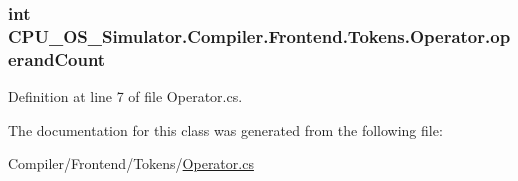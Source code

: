 \subsubsection[{operand\+Count}]{\setlength{\rightskip}{0pt plus 5cm}int C\+P\+U\+\_\+\+O\+S\+\_\+\+Simulator.\+Compiler.\+Frontend.\+Tokens.\+Operator.\+operand\+Count\hspace{0.3cm}{\ttfamily [private]}}\label{class_c_p_u___o_s___simulator_1_1_compiler_1_1_frontend_1_1_tokens_1_1_operator_a96e3a4c37284e7912243d510fd958caa}


Definition at line 7 of file Operator.\+cs.



The documentation for this class was generated from the following file\+:\begin{DoxyCompactItemize}
\item 
Compiler/\+Frontend/\+Tokens/\hyperlink{_operator_8cs}{Operator.\+cs}\end{DoxyCompactItemize}
